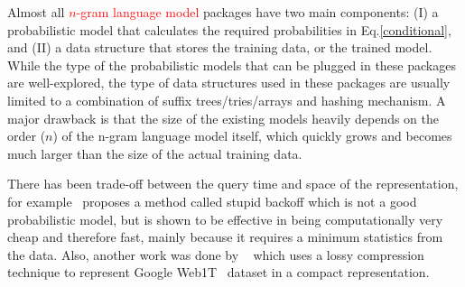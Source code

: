 \documentclass[11pt]{article}
\newcommand{\reza}[1]{\textcolor{red}{#1}}
\begin{document}
Almost all \reza{$n$-gram language model} packages have two main components: (I) a probabilistic model that calculates the required probabilities in Eq.\ref{conditional}, and (II) a data structure that stores the training data, or the trained model. While the type of the probabilistic models that can be plugged in these packages are well-explored, the type of data structures used in these packages are usually limited to a combination of suffix trees/tries/arrays and hashing mechanism. A major drawback is that the size of the existing models heavily depends on the order ($n$) of the n-gram language model itself, which quickly grows and becomes much larger than the size of the actual training data.
 
There has been trade-off between the query time and space of the representation, for example~\citep{brants2007large} proposes a method called stupid backoff which is not a good probabilistic model, but is shown to be effective in being computationally very cheap and therefore fast,  mainly because it requires a minimum statistics from the data. Also, another work was done by ~\citep{guthrie2010storing} which uses a lossy compression technique to represent Google Web1T~\citep{brants2006web} dataset in a compact representation.
   
\end{document}
